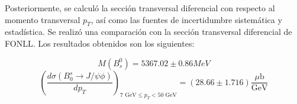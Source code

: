 Posteriormente, se calculó la sección transversal diferencial con respecto al momento transversal $p_T$, así como las fuentes de incertidumbre sistemática y estadística. Se realizó una comparación con la sección transversal diferencial de FONLL. Los resultados obtenidos son los siguientes:


$$M(B^0_s) = 5367.02 \pm 0.86 MeV $$
$$\left(\frac{d \sigma(B_0^s \to J/\psi\phi)}{dp_T} \right)_{ 7 \text{ GeV} \leq p_T < 50 \text{ GeV}} = (28.66 \pm 1.716) \frac{\mu\text{b}}{\text{GeV}}$$

